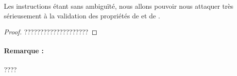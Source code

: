 \bigskip

Les instructions étant sans ambiguïté, nous allons pouvoir nous attaquer très sérieusement à la validation des propriétés de  et de .

\begin{proof}
	????????????????????
\end{proof}


\paragraph{Remarque :} ????
